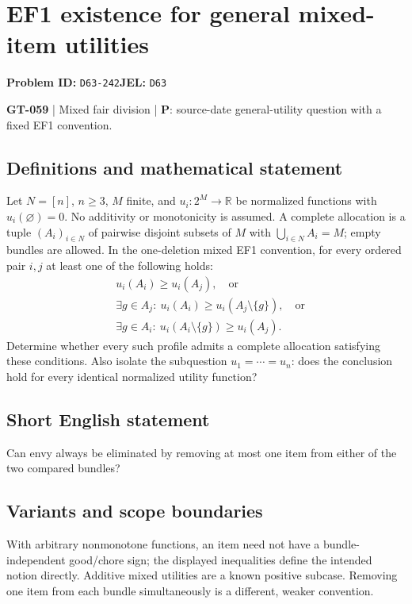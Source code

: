 \documentclass[11pt,a4paper]{article}
\begin{document}
\section*{EF1 existence for general mixed-item utilities}
\textbf{Problem ID:} \texttt{D63-242}\quad \textbf{JEL:} \texttt{D63}\par
\label{problem:OP-0189}
\label{game:GT-059}
{\sffamily\small\color{muted}
\textbf{GT-059} | Mixed fair division | \textbf{P}: source-date general-utility question with a fixed EF1 convention.
\par}
\subsection*{Definitions and mathematical statement}
Let $N=[n]$, $n\geq3$, $M$ finite, and $u_i:2^M\to\mathbb R$ be normalized functions with $u_i(\varnothing)=0$. No additivity or monotonicity is assumed. A complete allocation is a tuple $(A_i)_{i\in N}$ of pairwise disjoint subsets of $M$ with $\bigcup_{i\in N}A_i=M$; empty bundles are allowed. In the one-deletion mixed EF1 convention, for every ordered pair $i,j$ at least one of the following holds:
\[
 \begin{split}
 &u_i(A_i)\geq u_i(A_j),\quad\text{or}\\
 &\exists g\in A_j:\ u_i(A_i)\geq u_i(A_j\setminus\{g\}),\quad\text{or}\\
 &\exists g\in A_i:\ u_i(A_i\setminus\{g\})\geq u_i(A_j).
 \end{split}
\]
Determine whether every such profile admits a complete allocation satisfying these conditions. Also isolate the subquestion $u_1=\cdots=u_n$: does the conclusion hold for every identical normalized utility function?
\subsection*{Short English statement}
Can envy always be eliminated by removing at most one item from either of the two compared bundles?
\subsection*{Variants and scope boundaries}
With arbitrary nonmonotone functions, an item need not have a bundle-independent good/chore sign; the displayed inequalities define the intended notion directly. Additive mixed utilities are a known positive subcase. Removing one item from each bundle simultaneously is a different, weaker convention.
\end{document}
